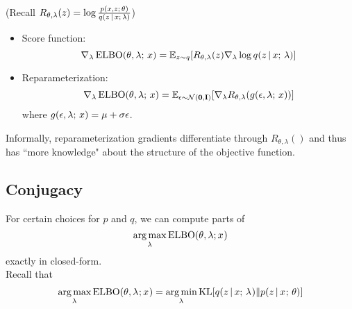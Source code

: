 

\begin{frame}
(Recall $R_{\theta, \lambda}(z) = \log \frac{p(x,z ; \, \theta)}{q(z \,|\, x ; \, \lambda)}$)
\begin{itemize}
\item Score function:
\[
    \nabla_\lambda \operatorname*{ELBO}(\theta, \lambda ; \, x) = \mathbb{E}_{z \sim q}[R_{\theta, \lambda}(z) \nabla_\lambda \log q(z \,|\,  x  ; \, \lambda)]
    \]
    \item Reparameterization:
\[
    \nabla_\lambda \operatorname*{ELBO}(\theta, \lambda ; \, x)  = \mathbb{E}_{\epsilon \sim \mathcal{N}(\mathbf{0}, \mathbf{I})}[\nabla_\lambda R_{\theta, \lambda}(g(\epsilon, \lambda ; \, x))]
\]
    where $g(\epsilon, \lambda ; \, x) = \mu + \sigma \epsilon$. 
\end{itemize}
Informally, reparameterization gradients differentiate through $R_{\theta, \lambda}()$ and thus has ``more knowledge"
about the structure of the objective function.
\end{frame}

\subsection{Conjugacy}


\begin{frame}
For certain choices for $p$ and $q$, we can compute parts of 
\[ \argmax_\lambda \ELBO(\theta, \lambda; x^{}) \]
exactly in closed-form. \\
\air 
\pause
Recall that 
\begin{align*}
     \argmax_{\lambda^{}} \ELBO(\theta, \lambda^{}; x^{}) =   \argmin_{\lambda^{}}  \KL[q(z \given x \param \lambda^{}) \Vert p(z \given x^{} \param \theta)] 
\end{align*}

\end{frame}

